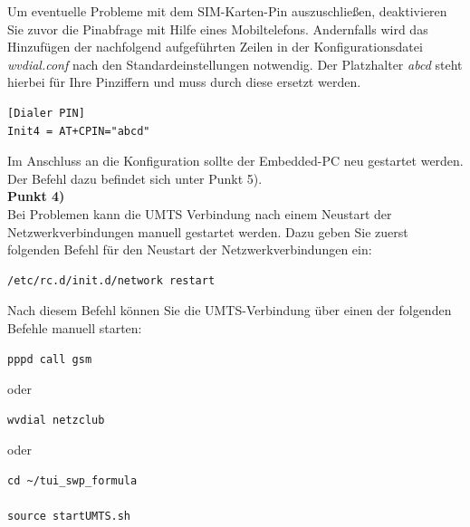 \documentclass[fontsize = 12pt, paper = a4]{scrreprt}
\begin{document}
Um eventuelle Probleme mit dem SIM-Karten-Pin auszuschließen, deaktivieren Sie zuvor die Pinabfrage mit Hilfe eines Mobiltelefons. Andernfalls wird das Hinzufügen der nachfolgend aufgeführten Zeilen in der Konfigurationsdatei \textit{wvdial.conf} nach den Standardeinstellungen notwendig. Der Platzhalter \textit{abcd} steht hierbei für Ihre Pinziffern und muss durch diese ersetzt werden.

\newpage

\begin{lstlisting}[frame=single]
[Dialer PIN]
Init4 = AT+CPIN="abcd"
\end{lstlisting} 
\vspace*{-2mm}

Im Anschluss an die Konfiguration sollte der Embedded-PC neu gestartet werden. Der Befehl dazu befindet sich unter Punkt 5). \\

\textbf{Punkt 4)} \\

Bei Problemen kann die UMTS Verbindung nach einem Neustart der Netzwerkverbindungen manuell gestartet werden.
Dazu geben Sie zuerst folgenden Befehl für den Neustart der Netzwerkverbindungen ein:

\vspace*{4mm}
\begin{lstlisting}[frame=single]
/etc/rc.d/init.d/network restart 
\end{lstlisting} 
\vspace*{-2mm}

Nach diesem Befehl können Sie die UMTS-Verbindung über einen der folgenden Befehle manuell starten:

\vspace*{4mm}
\begin{lstlisting}[frame=single]
pppd call gsm   
\end{lstlisting} 
\vspace*{-2mm}

oder

\vspace*{4mm}
\begin{lstlisting}[frame=single]
wvdial netzclub 
\end{lstlisting} 
\vspace*{-2mm}

oder 

\vspace*{4mm}
\begin{lstlisting}[frame=single]
cd ~/tui_swp_formula

source startUMTS.sh	
\end{lstlisting} 
\vspace*{-2mm}
\end{document}
